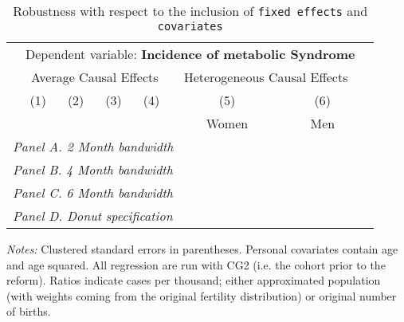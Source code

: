  \begin{table}[H] \begin{threeparttable} \centering \caption{Robustness with respect to the inclusion of \texttt{fixed effects} and \texttt{covariates}} {\def\sym#1{\ifmmode^{#1}\else\(^{#1}\)\fi} \begin{tabular}{l*{7}{c}} \toprule & \multicolumn{6}{c}{Dependent variable: \textbf{Incidence of metabolic Syndrome}} \\ \cmidrule(lr){2-7}
            &\multicolumn{4}{c}{Average Causal Effects}         &\multicolumn{2}{c}{Heterogeneous Causal Effects}\\\cmidrule(lr){2-5}\cmidrule(lr){6-7}
            &\multicolumn{1}{c}{(1)}&\multicolumn{1}{c}{(2)}&\multicolumn{1}{c}{(3)}&\multicolumn{1}{c}{(4)}&\multicolumn{1}{c}{(5)}&\multicolumn{1}{c}{(6)}\\
            &\multicolumn{1}{c}{}&\multicolumn{1}{c}{}&\multicolumn{1}{c}{}&\multicolumn{1}{c}{}&\multicolumn{1}{c}{Women}&\multicolumn{1}{c}{Men}\\
\midrule
 \multicolumn{7}{l}{\emph{Panel A. 2 Month bandwidth}} \\    \midrule\multicolumn{7}{l}{\emph{Panel B. 4 Month bandwidth}} \\    \midrule\multicolumn{7}{l}{\emph{Panel C. 6 Month bandwidth}} \\    \midrule\multicolumn{7}{l}{\emph{Panel D. Donut specification}} \\    \midrule  
\bottomrule \end{tabular} } \begin{tablenotes} \item \scriptsize \emph{Notes:} Clustered standard errors in parentheses. Personal covariates contain age and age squared. All regression are run with CG2 (i.e. the cohort prior to the reform). Ratios indicate cases per thousand; either approximated population (with weights coming from the original fertility distribution) or original number of births. \end{tablenotes} \end{threeparttable} \end{table} 
